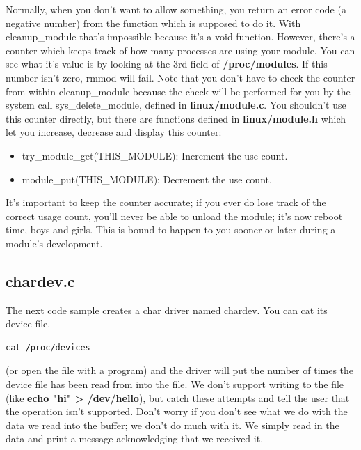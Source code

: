 \documentclass[11pt]{article}
\begin{document}
Normally, when you don't want to allow something, you return an error code (a negative number) from the function which is supposed to do it. With cleanup\_module that's impossible because it's a void function. However, there's a counter which keeps track of how many processes are using your module. You can see what it's value is by looking at the 3rd field of \textbf{/proc/modules}. If this number isn't zero, rmmod will fail. Note that you don't have to check the counter from within cleanup\_module because the check will be performed for you by the system call sys\_delete\_module, defined in \textbf{linux/module.c}. You shouldn't use this counter directly, but there are functions defined in \textbf{linux/module.h} which let you increase, decrease and display this counter:

\begin{itemize}
\item try\_module\_get(THIS\_MODULE): Increment the use count.
\item module\_put(THIS\_MODULE): Decrement the use count.
\end{itemize}

It's important to keep the counter accurate; if you ever do lose track of the correct usage count, you'll never be able to unload the module; it's now reboot time, boys and girls. This is bound to happen to you sooner or later during a module's development.

\subsection{chardev.c}
\label{sec:org7ce767e}
The next code sample creates a char driver named chardev. You can cat its device file.

\begin{verbatim}
cat /proc/devices
\end{verbatim}

(or open the file with a program) and the driver will put the number of times the device file has been read from into the file. We don't support writing to the file (like \textbf{echo "hi" > /dev/hello}), but catch these attempts and tell the user that the operation isn't supported. Don't worry if you don't see what we do with the data we read into the buffer; we don't do much with it. We simply read in the data and print a message acknowledging that we received it.
\end{document}
